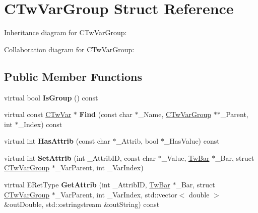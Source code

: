 \hypertarget{struct_c_tw_var_group}{\section{C\+Tw\+Var\+Group Struct Reference}
\label{struct_c_tw_var_group}
}


Inheritance diagram for C\+Tw\+Var\+Group\+:


Collaboration diagram for C\+Tw\+Var\+Group\+:
\subsection*{Public Member Functions}
\begin{DoxyCompactItemize}
\item 
\hypertarget{struct_c_tw_var_group_a91f6564fff4cbf2135ced417b8d05d93}{virtual bool {\bfseries Is\+Group} () const }\label{struct_c_tw_var_group_a91f6564fff4cbf2135ced417b8d05d93}

\item 
\hypertarget{struct_c_tw_var_group_adac78cf69a5d4a50e94f1288f31b99c6}{virtual const \hyperlink{struct_c_tw_var}{C\+Tw\+Var} $\ast$ {\bfseries Find} (const char $\ast$\+\_\+\+Name, \hyperlink{struct_c_tw_var_group}{C\+Tw\+Var\+Group} $\ast$$\ast$\+\_\+\+Parent, int $\ast$\+\_\+\+Index) const }\label{struct_c_tw_var_group_adac78cf69a5d4a50e94f1288f31b99c6}

\item 
\hypertarget{struct_c_tw_var_group_af49b55077dae1c5350cfce8e1068d209}{virtual int {\bfseries Has\+Attrib} (const char $\ast$\+\_\+\+Attrib, bool $\ast$\+\_\+\+Has\+Value) const }\label{struct_c_tw_var_group_af49b55077dae1c5350cfce8e1068d209}

\item 
\hypertarget{struct_c_tw_var_group_a74c07e7fb372864cbe77fb054cfc96d0}{virtual int {\bfseries Set\+Attrib} (int \+\_\+\+Attrib\+I\+D, const char $\ast$\+\_\+\+Value, \hyperlink{struct_c_tw_bar}{Tw\+Bar} $\ast$\+\_\+\+Bar, struct \hyperlink{struct_c_tw_var_group}{C\+Tw\+Var\+Group} $\ast$\+\_\+\+Var\+Parent, int \+\_\+\+Var\+Index)}\label{struct_c_tw_var_group_a74c07e7fb372864cbe77fb054cfc96d0}

\item 
\hypertarget{struct_c_tw_var_group_a646bac08205ef5f72ea7e641763f48c6}{virtual E\+Ret\+Type {\bfseries Get\+Attrib} (int \+\_\+\+Attrib\+I\+D, \hyperlink{struct_c_tw_bar}{Tw\+Bar} $\ast$\+\_\+\+Bar, struct \hyperlink{struct_c_tw_var_group}{C\+Tw\+Var\+Group} $\ast$\+\_\+\+Var\+Parent, int \+\_\+\+Var\+Index, std\+::vector$<$ double $>$ \&out\+Double, std\+::ostringstream \&out\+String) const }\label{struct_c_tw_var_group_a646bac08205ef5f72ea7e641763f48c6}


\end{DoxyCompactItemize}
